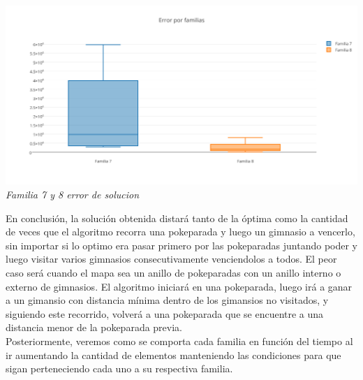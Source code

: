 \vspace*{0.3cm} \vspace*{0.3cm}
  \begin{center}
\includegraphics[scale=0.60]{./EJ2/box2.png}
\\{\textit{Familia 7 y 8 error de solucion}}
  \end{center}
  \vspace*{0.3cm}
  
En conclusi\'on, la soluci\'on obtenida distará tanto de la óptima como la cantidad de veces que el algoritmo recorra una pokeparada y luego un gimnasio a vencerlo, sin importar si lo optimo era pasar primero por las pokeparadas juntando poder y luego visitar varios gimnasios consecutivamente venciendolos a todos.
El peor caso será cuando el mapa sea un anillo de pokeparadas con un anillo interno o externo de gimnasios. 
El algoritmo iniciará en una pokeparada, luego irá a ganar a un gimansio con distancia mínima dentro de los gimansios no visitados, y siguiendo este recorrido, volverá a una pokeparada que se encuentre a una distancia menor de la pokeparada previa.\\

Posteriormente, veremos como se comporta cada familia en funci\'on del tiempo al ir aumentando la cantidad de elementos manteniendo las condiciones para que sigan perteneciendo cada uno a su respectiva familia.

